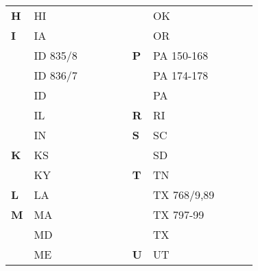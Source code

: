 \documentclass[twocolumn]{article}
\newenvironment{tttabular}[1]%
{\ttfamily \begin{tabular}{#1}}%
{\end{tabular}}
\begin{document}
\begin{adjustbox}{valign=t, max totalheight=\textheight}
\begin{tttabular}{@{}>{\bfseries}lll|l|ll >{\bfseries}lll|l|l@{}}
H & HI         & \cellcolor{blue}   & \cellcolor{blue}   & \cellcolor{blue}   &  &   & OK          & \cellcolor{orange} & \cellcolor{orange} & \cellcolor{blue}   \\
I & IA         & \cellcolor{yellow} & \cellcolor{yellow} & \cellcolor{yellow} &  &   & OR          & \cellcolor{green}  & \cellcolor{blue}   & \cellcolor{blue}   \\
  & ID 835/8   & \cellcolor{yellow} & \cellcolor{blue}   & \cellcolor{blue}   &  & P & PA 150-168  & \cellcolor{yellow} & \cellcolor{yellow} & \cellcolor{yellow} \\
  & ID 836/7   & \cellcolor{orange} & \cellcolor{blue}   & \cellcolor{blue}   &  &   & PA 174-178  & \cellcolor{orange} & \cellcolor{orange} & \cellcolor{blue}   \\
  & ID         & \cellcolor{grey}   & \cellcolor{blue}   & \cellcolor{blue}   &  &   & PA          & \cellcolor{yellow} & \cellcolor{yellow} & \cellcolor{blue}   \\
  & IL         & \cellcolor{orange} & \cellcolor{orange} & \cellcolor{orange} &  & R & RI          & \cellcolor{blue}   & \cellcolor{blue}   & \cellcolor{blue}   \\
  & IN         & \cellcolor{yellow} & \cellcolor{yellow} & \cellcolor{yellow} &  & S & SC          & \cellcolor{blue}   & \cellcolor{blue}   & \cellcolor{blue}   \\
K & KS         & \cellcolor{purple} & \cellcolor{purple} & \cellcolor{purple} &  &   & SD          & \cellcolor{purple} & \cellcolor{purple} & \cellcolor{purple} \\
  & KY         & \cellcolor{orange} & \cellcolor{orange} & \cellcolor{orange} &  & T & TN          & \cellcolor{grey}   & \cellcolor{grey}   & \cellcolor{blue}   \\
L & LA         & \cellcolor{orange} & \cellcolor{orange} & \cellcolor{blue}   &  &   & TX 768/9,89 & \cellcolor{purple} & \cellcolor{blue}   & \cellcolor{blue}   \\
M & MA         & \cellcolor{blue}   & \cellcolor{blue}   & \cellcolor{blue}   &  &   & TX 797-99   & \cellcolor{purple} & \cellcolor{blue}   & \cellcolor{blue}   \\
  & MD         & \cellcolor{orange} & \cellcolor{orange} & \cellcolor{blue}   &  &   & TX          & \cellcolor{purple} & \cellcolor{purple} & \cellcolor{blue}   \\
  & ME         & \cellcolor{blue}   & \cellcolor{blue}   & \cellcolor{blue}   &  & U & UT          & \cellcolor{yellow} & \cellcolor{blue}   & \cellcolor{blue}   \\

\end{tttabular}
\end{adjustbox}
\end{document}
